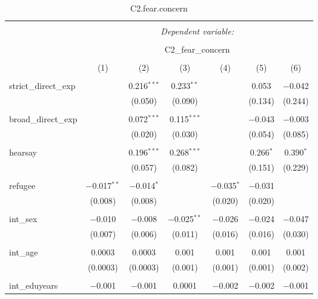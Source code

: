 
\begin{table}[H] \centering 
  \caption{C2.fear.concern} 
  \label{} 
\tiny 
\begin{tabular}{@{\extracolsep{4pt}}lcccccc} 
\\[-1.8ex]\hline 
\hline \\[-1.8ex] 
 & \multicolumn{6}{c}{\textit{Dependent variable:}} \\ 
\cline{2-7} 
\\[-1.8ex] & \multicolumn{6}{c}{C2\_fear\_concern} \\ 
\\[-1.8ex] & (1) & (2) & (3) & (4) & (5) & (6)\\ 
\hline \\[-1.8ex] 
 strict\_direct\_exp &  & 0.216$^{***}$ & 0.233$^{**}$ &  & 0.053 & $-$0.042 \\ 
  &  & (0.050) & (0.090) &  & (0.134) & (0.244) \\ 
  & & & & & & \\ 
 broad\_direct\_exp &  & 0.072$^{***}$ & 0.115$^{***}$ &  & $-$0.043 & $-$0.003 \\ 
  &  & (0.020) & (0.030) &  & (0.054) & (0.085) \\ 
  & & & & & & \\ 
 hearsay &  & 0.196$^{***}$ & 0.268$^{***}$ &  & 0.266$^{*}$ & 0.390$^{*}$ \\ 
  &  & (0.057) & (0.082) &  & (0.151) & (0.229) \\ 
  & & & & & & \\ 
 refugee & $-$0.017$^{**}$ & $-$0.014$^{*}$ &  & $-$0.035$^{*}$ & $-$0.031 &  \\ 
  & (0.008) & (0.008) &  & (0.020) & (0.020) &  \\ 
  & & & & & & \\ 
 int\_sex & $-$0.010 & $-$0.008 & $-$0.025$^{**}$ & $-$0.026 & $-$0.024 & $-$0.047 \\ 
  & (0.007) & (0.006) & (0.011) & (0.016) & (0.016) & (0.030) \\ 
  & & & & & & \\ 
 int\_age & 0.0003 & 0.0003 & 0.001 & 0.001 & 0.001 & 0.001 \\ 
  & (0.0003) & (0.0003) & (0.001) & (0.001) & (0.001) & (0.002) \\ 
  & & & & & & \\ 
 int\_eduyears & $-$0.001 & $-$0.001 & 0.0001 & $-$0.002 & $-$0.002 & $-$0.001 \\ 

\end{tabular}
\end{table}
